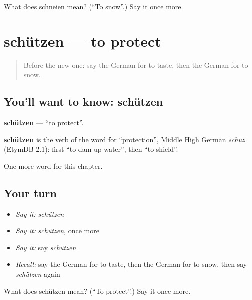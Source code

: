 \begin{tcolorbox}[breakable,colback=teal!4,colframe=teal!35!black,title={Before you move on}]
What does schneien mean? (\textquotedblleft{}To snow\textquotedblright{}.) Say it once more.
\end{tcolorbox}
\section[schützen]{schützen — to protect}

\label{lesson:GE-C186-schuetzen}



\begin{quote}
Before the new one: say the German for to taste, then the German for to snow.
\end{quote}

\subsection*{You'll want to know: schützen}
\textbf{schützen} — \textquotedblleft{}to protect\textquotedblright{}.

\begin{cousinweb}
\textbf{schützen} is the verb of the word for \textquotedblleft{}protection\textquotedblright{}, Middle High German \emph{schuz} (EtymDB 2.1): first \textquotedblleft{}to dam up water\textquotedblright{}, then \textquotedblleft{}to shield\textquotedblright{}.
\end{cousinweb}

\begin{grammarlens}[title={What you've built}]
One more word for this chapter.
\end{grammarlens}

\subsection*{Your turn}
\begin{itemize}
\raggedright
  \item \emph{Say it:} \emph{schützen}
  \item \emph{Say it:} \emph{schützen}, once more
  \item \emph{Say it:} say \emph{schützen}
  \item \emph{Recall:} say the German for to taste, then the German for to snow, then say \emph{schützen} again
\end{itemize}

\begin{tcolorbox}[breakable,colback=teal!4,colframe=teal!35!black,title={Before you move on}]
What does schützen mean? (\textquotedblleft{}To protect\textquotedblright{}.) Say it once more.
\end{tcolorbox}
